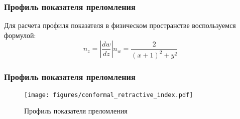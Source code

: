 \begin{frame}\frametitle{Профиль показателя преломления}
	Для расчета профиля показателя в физическом пространстве воспользуемся формулой:
	\begin{equation}
		n_z =
		\left|\frac{dw}{dz}\right| n_w =
		\frac{2}{(x+1)^2+y^2}
		\label{eq:retractive_index}
	\end{equation}

\end{frame}

\begin{frame}\frametitle{Профиль показателя преломления}
	\begin{figure}
		\texttt{[image: figures/conformal\_retractive\_index.pdf]}
		\caption{Профиль показателя преломления}
	\end{figure}
\end{frame}
